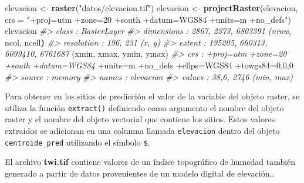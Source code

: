 \documentclass[11pt,b5paper,]{krantz}
\newenvironment{Shaded}{}{}
\newcommand{\CommentTok}[1]{\textcolor[rgb]{0.38,0.63,0.69}{\textit{#1}}}
\newcommand{\DataTypeTok}[1]{\textcolor[rgb]{0.56,0.13,0.00}{#1}}
\newcommand{\DecValTok}[1]{\textcolor[rgb]{0.25,0.63,0.44}{#1}}
\newcommand{\ErrorTok}[1]{\textcolor[rgb]{1.00,0.00,0.00}{\textbf{#1}}}
\newcommand{\KeywordTok}[1]{\textcolor[rgb]{0.00,0.44,0.13}{\textbf{#1}}}
\newcommand{\NormalTok}[1]{#1}
\newcommand{\OperatorTok}[1]{\textcolor[rgb]{0.40,0.40,0.40}{#1}}
\newcommand{\StringTok}[1]{\textcolor[rgb]{0.25,0.44,0.63}{#1}}
\begin{document}
\begin{Shaded}
\begin{Highlighting}[]
\NormalTok{elevacion <-}\StringTok{ }\KeywordTok{raster}\NormalTok{(}\StringTok{"datos/elevacion.tif"}\NormalTok{)}
\NormalTok{elevacion <-}
\StringTok{  }\KeywordTok{projectRaster}\NormalTok{(elevacion, }
                \DataTypeTok{crs =} \StringTok{"+proj=utm +zone=20 +south }
\StringTok{                +datum=WGS84 +units=m +no_defs"}\NormalTok{)}
\NormalTok{elevacion}
\CommentTok{#> class : RasterLayer}
\CommentTok{#> dimensions : 2867, 2373, 6803391 (nrow,}
\NormalTok{ncol, ncell}\ErrorTok{)}
\CommentTok{#> resolution : 196, 231 (x, y)}
\CommentTok{#> extent : 195205, 660313, 6099410, 6761687}
\NormalTok{(xmin, xmax, ymin, ymax)}
\CommentTok{#> crs : +proj=utm +zone=20 +south +datum=WGS84}
\OperatorTok{+}\NormalTok{units=m }\OperatorTok{+}\NormalTok{no_defs }\OperatorTok{+}\NormalTok{ellps=WGS84 }\OperatorTok{+}\NormalTok{towgs84=}\DecValTok{0}\NormalTok{,}\DecValTok{0}\NormalTok{,}\DecValTok{0}
\CommentTok{#> source : memory}
\CommentTok{#> names : elevacion}
\CommentTok{#> values : 38,6, 2746 (min, max)}
\end{Highlighting}
\end{Shaded}

Para obtener en los sitios de predicción el valor de la variable del objeto raster, se utiliza la función \texttt{extract()} definiendo como argumento el nombre del objeto raster y el nombre del objeto vectorial que contiene los sitios. Estos valores extraídos se adicionan en una columna llamada \texttt{elevacion} dentro del objeto \texttt{centroide\_pred} utilizando el símbolo \texttt{\$}.

\begin{Shaded}
\end{Shaded}

El archivo \textbf{twi.tif} contiene valores de un índice topográfico de humedad también generado a partir de datos provenientes de un modelo digital de elevación..
\end{document}
